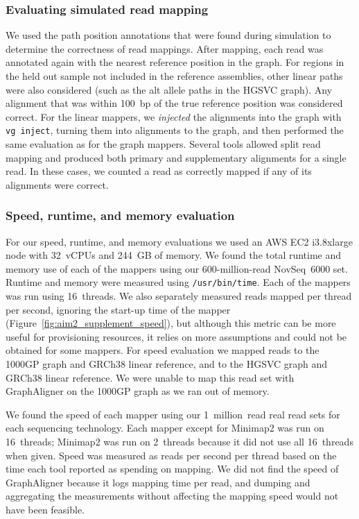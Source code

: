 \documentclass[11pt]{ucscthesis}
\begin{document}
\subsubsection{Evaluating simulated read mapping}

We used the path position annotations that were found during simulation to determine the correctness of read mappings.
After mapping, each read was annotated again with the nearest reference position in the graph.
For regions in the held out sample not included in the reference assemblies, other linear paths were also considered (such as the alt allele paths in the HGSVC graph).
Any alignment that was within 100~bp of the true reference position was considered correct.
For the linear mappers, we \textit{injected} the alignments into the graph with \texttt{vg~inject}, turning them into alignments to the graph, and then performed the same evaluation as for the graph mappers.
Several tools allowed split read mapping and produced both primary and supplementary alignments for a single read.
In these cases, we counted a read as correctly mapped if any of its alignments were correct.


\subsubsection{Speed, runtime, and memory evaluation}
\label{subsec:srgiraffe_speed}

For our speed, runtime, and memory evaluations we used an AWS EC2 i3.8xlarge node with 32~vCPUs and 244~GB of memory.
We found the total runtime and memory use of each of the mappers using our 600-million-read NovSeq~6000 set.
Runtime and memory were measured using \texttt{/usr/bin/time}.
Each of the mappers was run using 16~threads.
We also separately measured reads mapped per thread per second, ignoring the start-up time of the mapper (Figure~\ref{fig:aim2_supplement_speed}), but although this metric can be more useful for provisioning resources, it relies on more assumptions and could not be obtained for some mappers.
For speed evaluation we mapped reads to the 1000GP graph and GRCh38 linear reference, and to the HGSVC graph and GRCh38 linear reference.
We were unable to map this read set with GraphAligner on the 1000GP graph as we ran out of memory.

We found the speed of each mapper using our 1~million~read real read sets for each sequencing technology.
Each mapper except for Minimap2 was run on 16~threads; Minimap2 was run on 2~threads because it did not use all 16~threads when given.
Speed was measured as reads per second per thread based on the time each tool reported as spending on mapping.
We did not find the speed of GraphAligner because it logs mapping time per read, and dumping and aggregating the measurements without affecting the mapping speed would not have been feasible.
\end{document}
